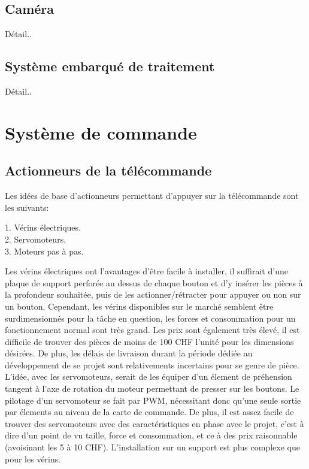 \subsection{Caméra}
Détail..
\subsection{Système embarqué de traitement}
Détail..

\section{Système de commande}
\subsection{Actionneurs de la télécommande}
Les idées de base d'actionneurs permettant d'appuyer sur la télécommande sont les suivants:
\begin{listage}
    1. Vérins électriques.\\
    2. Servomoteurs.\\
    3. Moteurs pas à pas.
\end{listage}

Les vérins électriques ont l'avantages d'être facile à installer, il suffirait d'une plaque de support perforée au dessus de chaque bouton et d'y insérer
les pièces à la profondeur souhaitée, puis de les actionner/rétracter pour appuyer ou non sur un bouton. Cependant, les vérins disponibles sur le marché semblent être surdimensionnés pour la tâche en question, les forces et
consommation pour un fonctionnement normal sont très grand. Les prix sont également très élevé, il est difficile de trouver des pièces de moins de 100 CHF l'unité
pour les dimensions désirées. De plus, les délais de livraison durant la période dédiée au développement de se projet sont relativements incertains pour se genre de pièce.\\

L'idée, avec les servomoteurs, serait de les équiper d'un élement de préhension tangent à l'axe de rotation du moteur permettant de presser sur les boutons.
Le pilotage d'un servomoteur se fait par PWM, nécessitant donc qu'une seule sortie par élements au niveau de la carte de commande. De plus, il est assez facile de
trouver des servomoteurs avec des caractéristiques en phase avec le projet, c'est à dire d'un point de vu taille, force et consommation, et ce à des prix
raisonnable (avoisinant les 5 à 10 CHF). L'installation sur un support est plus complexe que pour les vérins.\\

